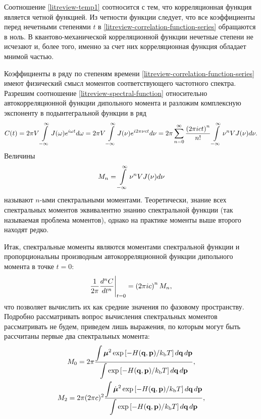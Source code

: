 Соотношение \eqref{litreview-temp1} соотносится с тем, что корреляционная функция является четной функцией. Из четности функции следует, что все коэффициенты перед нечетными степенями $t$ в \eqref{litreview-correlation-function-series} обращаются в ноль. В квантово-механической корреляционной функции нечетные степени не исчезают и, более того, именно за счет них корреляционная функция обладает мнимой частью. \par
Коэффициенты в ряду по степеням времени \eqref{litreview-correlation-function-series} имеют физический смысл моментов соответствующего частотного спектра. Разрешим соотношение \eqref{litreview-spectral-function} относительно автокорреляционной функции дипольного момента и разложим комплексную экспоненту в подынтегральной функции в ряд
\begin{gather}
    C(t) = 2\pi V \int\limits_{-\infty}^\infty J(\omega) e^{i \omega t} d \omega = 2 \pi V \int\limits_{-\infty}^\infty J(\nu) e^{i 2\pi \nu c t} d\nu = 2 \pi \sum_{n = 0}^\infty \frac{\left( 2\pi i c t\right)^n}{n!} \int\limits_{-\infty}^\infty \nu^n V J(\nu) d\nu. 
\end{gather}
%
Величины
\begin{gather}
    M_n = \int\limits_{-\infty}^\infty \nu^n V J(\nu) d\nu \label{litreview-spectral-function-moments}
\end{gather}
%
называют $n$-ыми спектральными моментами. Теоретически, знание всех спектральных моментов эквивалентно знанию спектральной функции (так называемая проблема моментов), однако на практике моменты выше второго находят редко. \par
Итак, спектральные моменты являются моментами спектральной функции и пропорциональны производным автокорреляционной функции дипольного момента в точке $t = 0$:
\begin{gather}
    \frac{1}{2 \pi} \frac{d^n C}{dt^n} \Bigg\vert_{t = 0} = \left( 2 \pi ic \right)^n M_n,
\end{gather}
%
что позволяет вычислить их как средние значения по фазовому пространству. Подробно рассматривать вопрос вычисления спектральных моментов рассматривать не будем, приведем лишь выражения, по которым могут быть рассчитаны первые два спектральных момента:
\begin{gather}
    M_0 = 2 \pi \frac{\displaystyle \int \boldsymbol{\mu}^2 \exp \left[ -H(\mathbf{q}, \mathbf{p}) / k_\text{b} T \right] d\mathbf{q} \, d\mathbf{p}}{\displaystyle \int \exp \left[ -H(\mathbf{q}, \mathbf{p}) / k_\text{b} T \right] d\mathbf{q} \, d\mathbf{p}}, \label{litreview-m0-phase-space} \\
    M_2 = 2 \pi (2 \pi c)^2 \frac{\displaystyle \int \dot{\boldsymbol{\mu}}^2 \exp \left[ -H(\mathbf{q}, \mathbf{p}) / k_\text{b} T \right] d\mathbf{q} \, d\mathbf{p}}{\displaystyle \int \exp \left[ -H(\mathbf{q}, \mathbf{p}) / k_\text{b} T \right] d\mathbf{q} \, d\mathbf{p}}, \label{litreview-m2-phase-space}
\end{gather}
